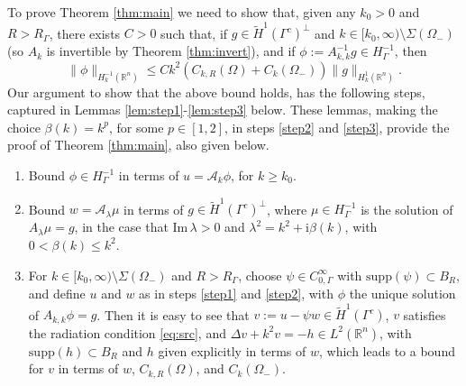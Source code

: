 \documentclass{birkjour}
\theoremstyle{definition}
\theoremstyle{remark}
\numberwithin{equation}{section}
\newcommand{\R}{\mathbb{R}}
\newcommand{\ri}{\mathrm{i}}
\newcommand{\cA}{\mathcal{A}}
\newcommand{\supp}{\mathrm{supp}}
\begin{document}
To prove Theorem \ref{thm:main} we need to show that, given any $k_0>0$ and $R>R_\Gamma$, there exists $C>0$ such that, if $g\in \widetilde H^1(\Gamma^c)^\perp$ and $k\in [k_0,\infty)\setminus \Sigma(\Omega_-)$ (so $A_k$ is invertible by Theorem \ref{thm:invert}), and if $\phi:=A_{k,k}^{-1}g\in H^{-1}_\Gamma$, then
\begin{equation} \label{eq:need}
\|\phi\|_{H_k^{-1}(\R^n)} \leq Ck^2\left(C_{k,R}(\Omega) + C_k(\Omega_-)\right)\|g\|_{H^1_k(\R^n)}.
\end{equation}
Our argument to show that the above bound holds, has the following steps, captured in Lemmas \ref{lem:step1}-\ref{lem:step3} below. These lemmas, making the choice $\beta(k)=k^p$, for some $p\in [1,2]$, in steps \ref{step2} and \ref{step3}, provide the proof of Theorem \ref{thm:main}, also given below.
\begin{enumerate}
\item \label{step1} Bound $\phi\in H^{-1}_\Gamma$ in terms of $u=\cA_k \phi$, for $k\geq k_0$.
\item \label{step2} Bound $w=\cA_\lambda \mu$ in terms of $g\in \widetilde H^1(\Gamma^c)^\perp$, where $\mu \in H^{-1}_\Gamma$ is the solution of $A_\lambda \mu = g$, in the case that $\mathrm{Im}\, \lambda>0$ and $\lambda^2 = k^2 + \ri \beta(k)$, with $0<\beta(k)\leq k^2$.
\item \label{step3} For $k\in [k_0,\infty)\setminus \Sigma(\Omega_-)$ and $R>R_\Gamma$, choose $\psi \in C_{0,\Gamma}^\infty$ with $\supp(\psi)\subset B_R$, and define  $u$ and $w$ as in steps \ref{step1} and \ref{step2}, with $\phi$ the unique solution of $A_{k,k}\phi = g$. Then it is easy to see that $v:= u-\psi w\in \widetilde H^1(\Gamma^c)$, $v$ satisfies the radiation condition \eqref{eq:src}, and $\Delta v + k^2 v = -h\in L^2(\R^n)$, with $\supp(h)\subset B_R$ and $h$ given explicitly in terms of $w$, which leads to a bound for $v$ in terms of $w$, $C_{k,R}(\Omega)$, and $C_k(\Omega_-)$.
\end{enumerate}
\end{document}
